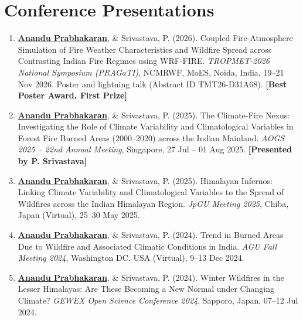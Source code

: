 \documentclass[letterpaper,11pt]{article}
\begin{document}
\section{Conference Presentations}
\vspace{-5pt}
\begin{justify}
\begin{enumerate}[leftmargin=*]

    \item \underline{\textbf{Anandu Prabhakaran}}, \& Srivastava, P. (2026). Coupled Fire-Atmosphere Simulation of Fire Weather Characteristics and Wildfire Spread across Contrasting Indian Fire Regimes using WRF-FIRE. \textit{TROPMET-2026 National Symposium (PRAGaTI)}, NCMRWF, MoES, Noida, India, 19--21 Nov 2026. Poster and lightning talk (Abstract ID TMT26-D31A68). \textbf{[Best Poster Award, First Prize]}
    \vspace{0.12cm}

    \item \underline{\textbf{Anandu Prabhakaran}}, \& Srivastava, P. (2025). The Climate-Fire Nexus: Investigating the Role of Climate Variability and Climatological Variables in Forest Fire Burned Areas (2000--2020) across the Indian Mainland. \textit{AOGS 2025 -- 22nd Annual Meeting}, Singapore, 27 Jul -- 01 Aug 2025. \textbf{[Presented by P. Srivastava]}
    \vspace{0.15cm}

    \item \underline{\textbf{Anandu Prabhakaran}}, \& Srivastava, P. (2025). Himalayan Infernos: Linking Climate Variability and Climatological Variables to the Spread of Wildfires across the Indian Himalayan Region. \textit{JpGU Meeting 2025}, Chiba, Japan (Virtual), 25--30 May 2025.
    \vspace{0.12cm}

    \item \underline{\textbf{Anandu Prabhakaran}}, \& Srivastava, P. (2024). Trend in Burned Areas Due to Wildfire and Associated Climatic Conditions in India. \textit{AGU Fall Meeting 2024}, Washington DC, USA (Virtual), 9--13 Dec 2024.
    \vspace{0.12cm}

    \item \underline{\textbf{Anandu Prabhakaran}}, \& Srivastava, P. (2024). Winter Wildfires in the Lesser Himalayas: Are These Becoming a New Normal under Changing Climate? \textit{GEWEX Open Science Conference 2024}, Sapporo, Japan, 07--12 Jul 2024.
    \vspace{0.12cm}


\end{enumerate}
\end{justify}
\end{document}
